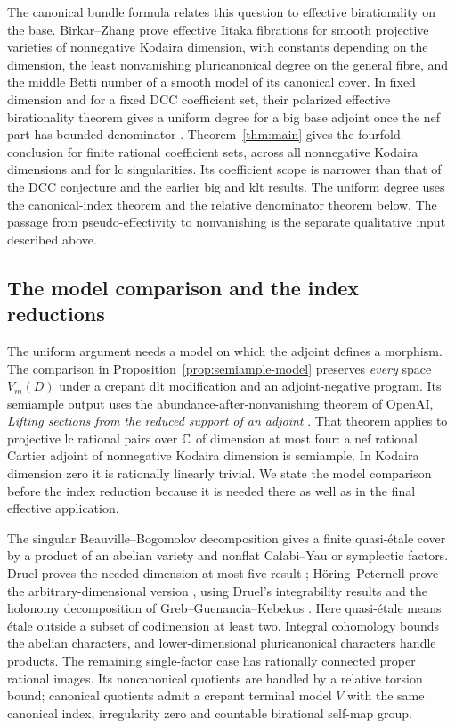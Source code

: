 The canonical bundle formula relates this question to effective
birationality on the base. Birkar--Zhang prove effective Iitaka
fibrations for smooth projective varieties of nonnegative Kodaira
dimension, with constants depending on the dimension, the least
nonvanishing pluricanonical degree on the general fibre, and the
middle Betti number of a smooth model of its canonical cover.
In fixed dimension and
for a fixed DCC coefficient set, their polarized effective
birationality theorem gives a uniform degree for a big base adjoint
once the nef part has bounded denominator
\cite[Theorems~1.2--1.3]{BirkarZhang2016}.
Theorem~\ref{thm:main} gives the fourfold conclusion for finite
rational coefficient sets, across all nonnegative Kodaira dimensions
and for lc singularities. Its coefficient scope is narrower than
that of the DCC conjecture and the earlier big and klt results.
The uniform degree uses the canonical-index theorem and the
relative denominator theorem below. The passage from
pseudo-effectivity to nonvanishing is the separate qualitative
input described above.

\subsection{The model comparison and the index reductions}

The uniform argument needs a model on which the adjoint defines a morphism. The
comparison in Proposition~\ref{prop:semiample-model} preserves
\emph{every} space $V_m(D)$ under a crepant dlt modification and an
adjoint-negative program. Its semiample output uses the
abundance-after-nonvanishing theorem of OpenAI,
\emph{Lifting sections from the reduced support of an adjoint}
\cite[Theorem~\BANumber]{OpenAILifting}. That theorem
applies to projective lc rational pairs over $\mathbb C$ of dimension at
most four: a nef rational Cartier adjoint of nonnegative Kodaira
dimension is semiample. In Kodaira dimension zero it is rationally
linearly trivial. We state the model comparison before the index
reduction because it is needed there as well as in the final
effective application.

The singular Beauville--Bogomolov decomposition gives a finite
quasi-\'etale cover by a product of an abelian variety and nonflat
Calabi--Yau or symplectic factors. Druel proves the needed
dimension-at-most-five result \cite[Theorem~1.2]{Druel2018};
H\"oring--Peternell prove the arbitrary-dimensional version
\cite[Theorem~1.5]{HoringPeternell2019}, using Druel's integrability
results and the holonomy decomposition of Greb--Guenancia--Kebekus
\cite[Theorem~B and Proposition~D]{GGK2019}.
Here quasi-\'etale means \'etale outside a subset of codimension
at least two. Integral cohomology bounds the abelian characters,
and lower-dimensional pluricanonical characters handle products.
The remaining single-factor case has rationally connected proper
rational images. Its noncanonical quotients are handled by a
relative torsion bound; canonical quotients admit a crepant
terminal model $V$ with the same canonical index, irregularity
zero and countable birational self-map group.

